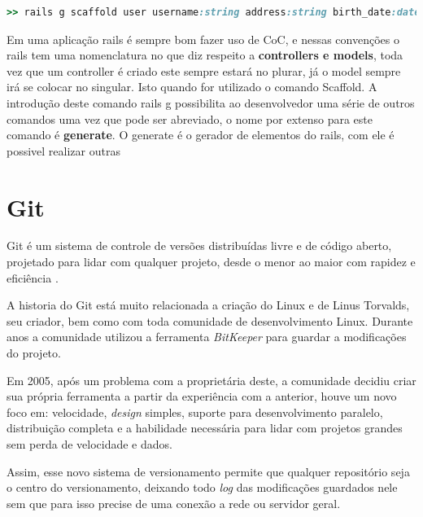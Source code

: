 {\singlespace
\begin{lstlisting}[caption=Exemplo de uso de scaffold, language=Ruby,label={scaffold}]
  >> rails g scaffold user username:string address:string birth_date:date
\end{lstlisting}
}

Em uma aplicação rails é sempre bom fazer uso de CoC, e nessas convenções o rails tem uma nomenclatura no que diz respeito a \textbf{controllers e models}, toda vez que um controller é criado
este sempre estará no plurar, já o model sempre irá se colocar no singular. Isto quando for utilizado o comando Scaffold. A introdução deste comando rails g possibilita ao desenvolvedor uma série de outros comandos
uma vez que pode ser abreviado, o nome por extenso para este comando é \textbf{generate}. O generate é o gerador de elementos do rails, com ele é possivel realizar outras 


\section{Git}

Git é um sistema de controle de versões distribuídas livre e de código aberto, projetado para lidar com qualquer projeto, desde o menor ao maior com rapidez e eficiência \cite{SOFTWARE-FREEDOM-CONSERVANCY}.

A historia do Git está muito relacionada a criação do Linux e de Linus Torvalds, seu criador, bem como com toda comunidade de desenvolvimento Linux. Durante anos a comunidade utilizou a ferramenta \textit{BitKeeper} para guardar a modificações do projeto.

Em 2005, após um problema com a proprietária deste, a comunidade decidiu criar sua própria ferramenta a partir da experiência com a anterior, houve um novo foco em: velocidade, \textit{design} simples, suporte para desenvolvimento paralelo, distribuição completa e a habilidade necessária para lidar com projetos grandes sem perda de velocidade e dados.

Assim, esse novo sistema de versionamento permite que qualquer repositório seja o centro do versionamento, deixando todo \textit{log} das modificações guardados nele sem que para isso precise de uma conexão a rede ou servidor geral.